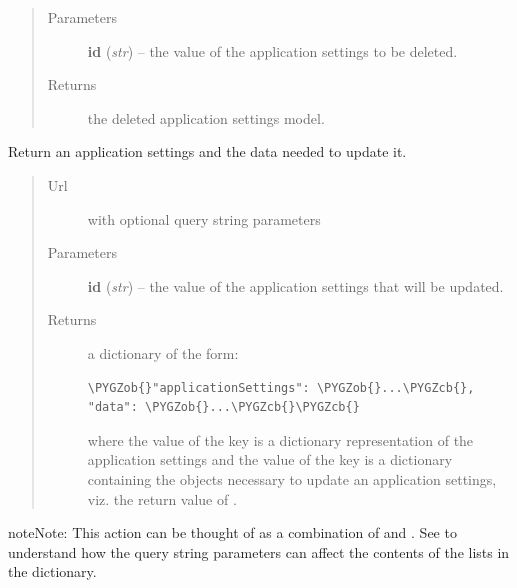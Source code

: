 \documentclass[letterpaper,10pt,english]{sphinxmanual}
\def\PYGZob{\char`\{}
\def\PYGZcb{\char`\}}
\begin{document}
\begin{fulllineitems}
\begin{fulllineitems}
\begin{quote}
\begin{description}
\item[{Parameters}] \leavevmode
\textbf{id} (\emph{str}) -- the  value of the application settings to be deleted.

\item[{Returns}] \leavevmode
the deleted application settings model.

\end{description}\end{quote}

\end{fulllineitems}


\begin{fulllineitems}
\label{api:onlinelinguisticdatabase.controllers.applicationsettings.ApplicationsettingsController.edit}
Return an application settings and the data needed to update it.
\begin{quote}\begin{description}
\item[{Url }] \leavevmode
{} with optional query string parameters

\item[{Parameters}] \leavevmode
\textbf{id} (\emph{str}) -- the  value of the application settings that will be updated.

\item[{Returns}] \leavevmode

a dictionary of the form:

\begin{Verbatim}[commandchars=\\\{\}]
\PYGZob{}"applicationSettings": \PYGZob{}...\PYGZcb{}, "data": \PYGZob{}...\PYGZcb{}\PYGZcb{}
\end{Verbatim}

where the value of the  key is a dictionary
representation of the application settings and the value of the
 key is a dictionary containing the objects necessary to
update an application settings, viz. the return value of
.


\end{description}\end{quote}

\begin{notice}{note}{Note:}
This action can be thought of as a combination of
 and
.  See
 to understand how the query
string parameters can affect the contents of the lists in the
 dictionary.
\end{notice}


\end{fulllineitems}
\end{fulllineitems}
\end{document}
